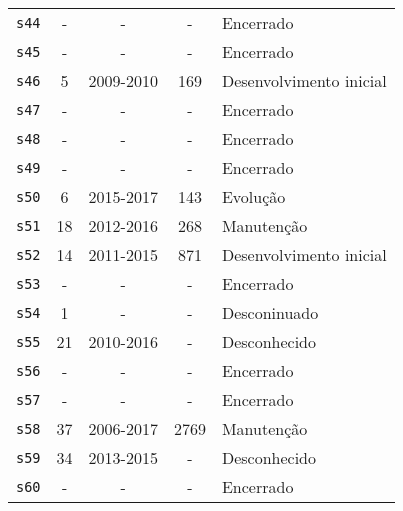 \begin{longtable}{ l c c c l }
    \texttt{s44} & - & - & - & Encerrado \\
    \texttt{s45} & - & - & - & Encerrado \\
    \texttt{s46} & 5 & 2009-2010 & 169 & Desenvolvimento inicial \\
    \texttt{s47} & - & - & - & Encerrado \\
    \texttt{s48} & - & - & - & Encerrado \\
    \texttt{s49} & - & - & - & Encerrado \\
    \texttt{s50} & 6 & 2015-2017 & 143 & Evolução \\
    \texttt{s51} & 18 & 2012-2016 & 268 & Manutenção \\
    \texttt{s52} & 14 & 2011-2015 & 871 & Desenvolvimento inicial \\
    \texttt{s53} & - & - & - & Encerrado \\
    \texttt{s54} & 1 & - & - & Desconinuado \\
    \texttt{s55} & 21 & 2010-2016 & - & Desconhecido \\
    \texttt{s56} & - & - & - & Encerrado \\
    \texttt{s57} & - & - & - & Encerrado \\
    \texttt{s58} & 37 & 2006-2017 & 2769 & Manutenção \\
    \texttt{s59} & 34 & 2013-2015 & - & Desconhecido \\
    \texttt{s60} & - & - & - & Encerrado \\
\end{longtable}
